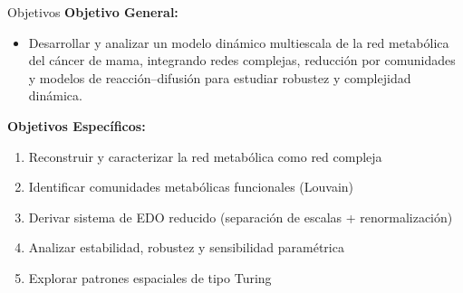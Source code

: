 \documentclass[aspectratio=169, 11pt]{beamer}
\begin{document}
	\begin{frame}{Objetivos}
		\textbf{Objetivo General:}
		\begin{itemize}
			\item Desarrollar y analizar un modelo dinámico multiescala de la red metabólica del cáncer de mama, integrando redes complejas, reducción por comunidades y modelos de reacción–difusión para estudiar robustez y complejidad dinámica.
		\end{itemize}
		
		\vspace{0.3cm}
		\textbf{Objetivos Específicos:}
		\begin{enumerate}
			\item Reconstruir y caracterizar la red metabólica como red compleja
			\item Identificar comunidades metabólicas funcionales (Louvain)
			\item Derivar sistema de EDO reducido (separación de escalas + renormalización)
			\item Analizar estabilidad, robustez y sensibilidad paramétrica
			\item Explorar patrones espaciales de tipo Turing
		\end{enumerate}
	\end{frame}
	
\end{document}
